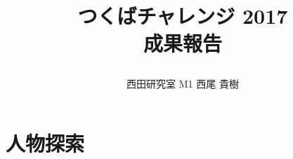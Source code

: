 \documentclass[twocolumn,10pt]{jarticle}
\title{\vspace{-20truemm}
{\normalsize \rightline{平成29年\ 12月\ 13日}}
{\large つくばチャレンジ 2017\\}
成果報告
\date{}
\vspace{-2truemm}}
\author{西田研究室 M1 西尾 貴樹} %
\begin{document}
\twocolumn[\maketitle]



\section{人物探索}
\end{document}
